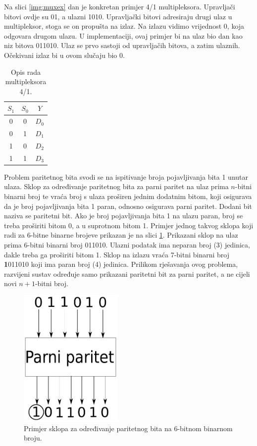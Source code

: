 \documentclass[times, utf8, zavrsni]{fer}
\begin{document}
Na slici \ref{img:muxex} dan je konkretan primjer 4/1 multipleksora.
Upravljači bitovi ovdje su 01, a ulazni 1010.
Upravljački bitovi adresiraju drugi ulaz u multipleksor, stoga se on propušta na izlaz.
Na izlazu vidimo vrijednost 0, koja odgovara drugom ulazu.
U implementaciji, ovaj primjer bi na ulaz bio dan kao niz bitova 011010.
Ulaz se prvo sastoji od upravljačih bitova, a zatim ulaznih.
Očekivani izlaz bi u ovom slučaju bio 0.
\begin{table}[!htb]
    \caption{Opis rada multipleksora 4/1.}
    \label{tbl:mux}
    \centering
    \begin{tabular}{c | c | c}
        $S_{1}$ & $S_{0}$ & $Y$     \\ \hline
              0 &       0 & $D_{0}$ \\
              0 &       1 & $D_{1}$ \\
              1 &       0 & $D_{2}$ \\
              1 &       1 & $D_{3}$ \\
    \end{tabular}
\end{table}

Problem paritetnog bita svodi se na ispitivanje broja pojavljivanja bita 1 unutar ulaza.
Sklop za određivanje paritetnog bita za parni paritet na ulaz prima $n$-bitni binarni broj te vraća broj s ulaza proširen jednim dodatnim bitom, koji osigurava da je broj pojavljivanja bita 1 paran, odnosno osigurava parni paritet.
Dodani bit naziva se paritetni bit.
Ako je broj pojavljivanja bita 1 na ulazu paran, broj se treba proširiti bitom 0, a u suprotnom bitom 1.
Primjer jednog takvog sklopa koji radi za 6-bitne binarne brojeve prikazan je na slici \ref{img:parex}. Prikazani sklop na ulaz prima 6-bitni binarni broj 011010.
Ulazni podatak ima neparan broj (3) jedinica, dakle treba ga proširiti bitom 1.
Sklop na izlazu vraća 7-bitni binarni broj \textbf{1}011010 koji ima paran broj (4) jedinica.
Prilikom rješavanja ovog problema, razvijeni sustav određuje samo prikazani paritetni bit za parni paritet, a ne cijeli novi $n + 1$-bitni broj.
\begin{figure}[h]
    \centering
    \includegraphics[width=5cm]{img/parity.pdf}
    \caption{Primjer sklopa za određivanje paritetnog bita na 6-bitnom binarnom broju.}
    \label{img:parex}
\end{figure}
\end{document}

